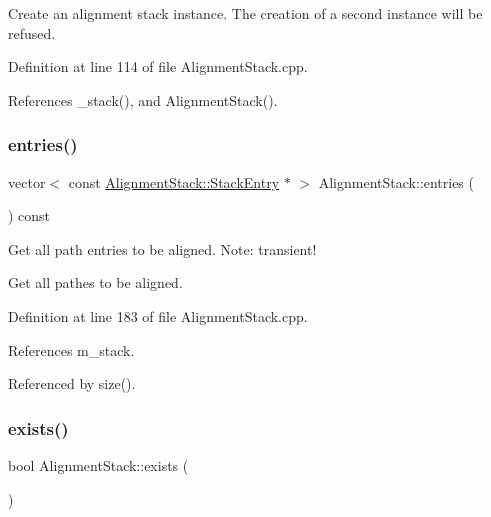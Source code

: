 Create an alignment stack instance. The creation of a second instance will be refused. 



Definition at line 114 of file Alignment\+Stack.\+cpp.



References \+\_\+stack(), and Alignment\+Stack().

\hypertarget{class_d_d4hep_1_1_alignments_1_1_alignment_stack_a57fcc9686b899679e7848b61e1baca72}{}\label{class_d_d4hep_1_1_alignments_1_1_alignment_stack_a57fcc9686b899679e7848b61e1baca72} 
\subsubsection{\texorpdfstring{entries()}{entries()}}
{\footnotesize\ttfamily vector$<$ const \hyperlink{struct_d_d4hep_1_1_alignments_1_1_alignment_stack_1_1_stack_entry}{Alignment\+Stack\+::\+Stack\+Entry} $\ast$ $>$ Alignment\+Stack\+::entries (\begin{DoxyParamCaption}{ }\end{DoxyParamCaption}) const}



Get all path entries to be aligned. Note\+: transient! 

Get all pathes to be aligned. 

Definition at line 183 of file Alignment\+Stack.\+cpp.



References m\+\_\+stack.



Referenced by size().

\hypertarget{class_d_d4hep_1_1_alignments_1_1_alignment_stack_aa2cbfdbfcd9a294c3f5487e5bf248b6a}{}\label{class_d_d4hep_1_1_alignments_1_1_alignment_stack_aa2cbfdbfcd9a294c3f5487e5bf248b6a} 
\subsubsection{\texorpdfstring{exists()}{exists()}}
{\footnotesize\ttfamily bool Alignment\+Stack\+::exists (\begin{DoxyParamCaption}{ }\end{DoxyParamCaption})\hspace{0.3cm}{\ttfamily [static]}}



